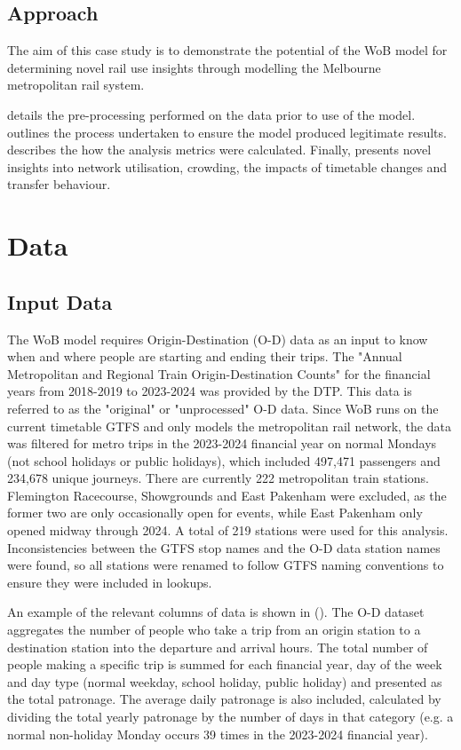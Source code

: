 \subsection{Approach}
The aim of this case study is to demonstrate the potential of the WoB model for determining novel rail use insights through modelling the Melbourne metropolitan rail system.

 details the pre-processing performed on the data prior to use of the model.  outlines the process undertaken to ensure the model produced legitimate results.  describes the how the analysis metrics were calculated. Finally,   presents novel insights into network utilisation, crowding, the impacts of timetable changes and transfer behaviour. 

\section{Data}
\label{sec:data}
\subsection{Input Data}
The WoB model requires Origin-Destination (O-D) data as an input to know when and where people are starting and ending their trips. The "Annual Metropolitan and Regional Train Origin-Destination Counts" for the financial years from 2018-2019 to 2023-2024 was provided by the DTP. This data is referred to as the "original" or "unprocessed" O-D data. Since WoB runs on the current timetable GTFS and only models the metropolitan rail network, the data was filtered for metro trips in the 2023-2024 financial year on normal Mondays (not school holidays or public holidays), which included 497,471 passengers and 234,678 unique journeys. There are currently 222 metropolitan train stations. Flemington Racecourse, Showgrounds and East Pakenham were excluded, as the former two are only occasionally open for events, while East Pakenham only opened midway through 2024. A total of 219 stations were used for this analysis. Inconsistencies between the GTFS stop names and the O-D data station names were found, so all stations were renamed to follow GTFS naming conventions to ensure they were included in lookups. 

An example of the relevant columns of data is shown in  (). The O-D dataset aggregates the number of people who take a trip from an origin station to a destination station into the departure and arrival hours. The total number of people making a specific trip is summed for each financial year, day of the week and day type (normal weekday, school holiday, public holiday) and presented as the total patronage. The average daily patronage is also included, calculated by dividing the total yearly patronage by the number of days in that category (e.g. a normal non-holiday Monday occurs 39 times in the 2023-2024 financial year).


